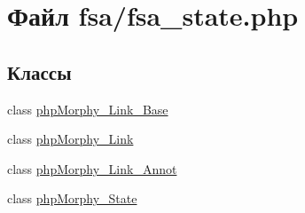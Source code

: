 \hypertarget{fsa__state_8php}{
\section{Файл fsa/fsa\_\-state.php}
\label{fsa__state_8php}
}
\subsection*{Классы}
\begin{DoxyCompactItemize}
\item 
class \hyperlink{classphpMorphy__Link__Base}{phpMorphy\_\-Link\_\-Base}
\item 
class \hyperlink{classphpMorphy__Link}{phpMorphy\_\-Link}
\item 
class \hyperlink{classphpMorphy__Link__Annot}{phpMorphy\_\-Link\_\-Annot}
\item 
class \hyperlink{classphpMorphy__State}{phpMorphy\_\-State}
\end{DoxyCompactItemize}
